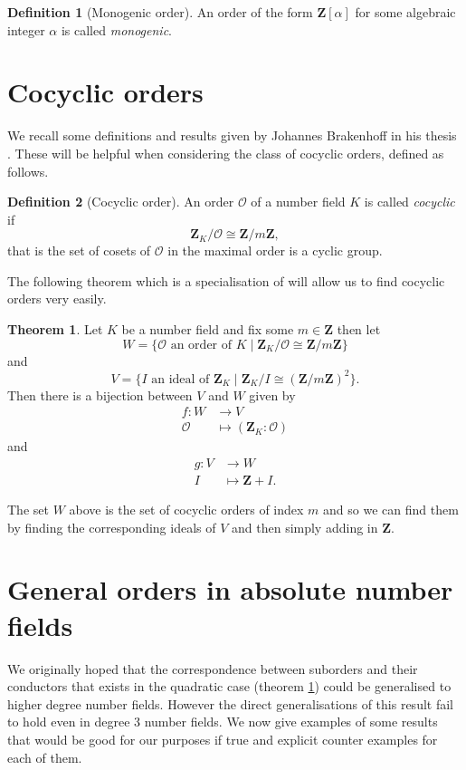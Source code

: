\documentclass[a4paper,abstracton]{scrreprt}
\theoremstyle{definition}
\newtheorem{thm}{Theorem}
\newtheorem{defn}{Definition}
\newcommand{\ZZ}{\mathbf{Z}}
\renewcommand{\O}{\mathcal{O}}
\begin{document}
\begin{defn}[Monogenic order]
An order of the form $\ZZ[\alpha]$ for some algebraic integer $\alpha$ is called \emph{monogenic}.
\end{defn}


\section{Cocyclic orders}

We recall some definitions and results given by Johannes Brakenhoff in his thesis \cite{brakenhoff}.
These will be helpful when considering the class of cocyclic orders, defined as follows.

\begin{defn}[Cocyclic order]
An order $\O$ of a number field $K$ is called \emph{cocyclic} if
\[
\ZZ_K/\O \cong \ZZ/m\ZZ,
\]
that is the set of cosets of $\O$ in the maximal order is a cyclic group.
\end{defn}

The following theorem which is a specialisation of \cite[Thm. 4.1]{brakenhoff} will allow us to find cocyclic orders very easily.

\begin{thm}
\label{thm:coresp}
Let $K$ be a number field and fix some $m\in\ZZ$ then let
\[
W = \{\O \text{ an order of } K\mid \ZZ_K/\O \cong \ZZ/m\ZZ\}
\]
and
\[
V = \{ I \text{ an ideal of }\ZZ_K \mid \ZZ_K/I \cong (\ZZ/m\ZZ)^2 \}.
\]
Then there is a bijection between $V$ and $W$ given by
\begin{align*}
f\colon W &\to V\\
\O &\mapsto (\ZZ_K\colon \O)
\end{align*}
and
\begin{align*}
g\colon V&\to W\\
I&\mapsto \ZZ + I.
\end{align*}
\end{thm}

The set $W$ above is the set of cocyclic orders of index $m$ and so we can find them by finding the corresponding ideals of $V$ and then simply adding in $\ZZ$.

\section{General orders in absolute number fields}

We originally hoped that the correspondence between suborders and their conductors that exists in the quadratic case (theorem \ref{thm:coresp}) could be generalised to higher degree number fields.
However the direct generalisations of this result fail to hold even in degree 3 number fields.
We now give examples of some results that would be good for our purposes if true and explicit counter examples for each of them.
\end{document}

